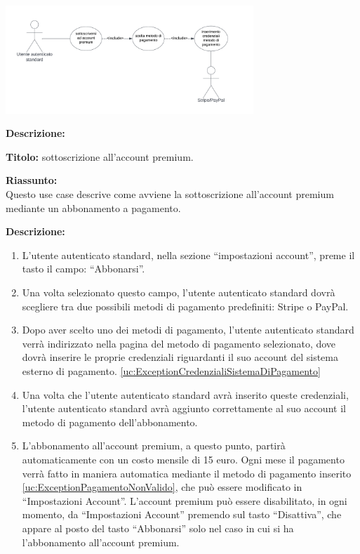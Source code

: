 \begin{listaPersonale}[UC]{}
    \newpage

    \begin{center}
        \includegraphics[width=0.7\textwidth]{img/Diagrammi/UseCases/UtentePremium.png}
    \end{center}

    \textbf{Descrizione:}

    \textbf{Titolo:} sottoscrizione all'account premium.

    \textbf{Riassunto:} \\
    Questo use case descrive come avviene la sottoscrizione all'account premium mediante un abbonamento a pagamento.

    \textbf{Descrizione:}
    \begin{enumerate}
        \item L'utente autenticato standard, nella sezione “impostazioni account”, preme il tasto il campo: “Abbonarsi”.
        \item Una volta selezionato questo campo, l'utente autenticato standard dovrà scegliere tra due possibili metodi di pagamento predefiniti: Stripe o PayPal.
        \item Dopo aver scelto uno dei metodi di pagamento, l'utente autenticato standard verrà indirizzato nella pagina del metodo di pagamento selezionato, dove dovrà inserire le proprie credenziali riguardanti il suo account del sistema esterno di pagamento. \ref{uc:ExceptionCredenzialiSistemaDiPagamento}
        \item Una volta che l'utente autenticato standard avrà inserito queste credenziali, l'utente autenticato standard avrà aggiunto correttamente al suo account il metodo di pagamento dell'abbonamento.
        \item L'abbonamento all'account premium, a questo punto, partirà automaticamente con un costo mensile di 15 euro. Ogni mese il pagamento verrà fatto in maniera automatica mediante il metodo di pagamento inserito \ref{uc:ExceptionPagamentoNonValido}, che può essere modificato in “Impostazioni Account”. L'account premium può essere disabilitato, in ogni momento, da “Impostazioni Account” premendo sul tasto “Disattiva”, che appare al posto del tasto “Abbonarsi” solo nel caso in cui si ha l'abbonamento all'account premium.
    \end{enumerate}


\end{listaPersonale}
